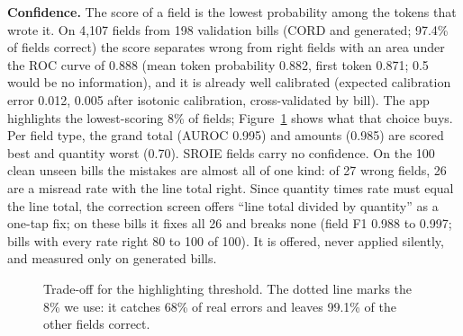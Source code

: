 \documentclass[10pt,a4paper]{article}
\begin{document}
\textbf{Confidence.} The score of a field is the lowest probability among the tokens that wrote it. On 4,107 fields from 198 validation bills (CORD and generated; 97.4\% of fields correct) the score separates wrong from right fields with an area under the ROC curve of 0.888 (mean token probability 0.882, first token 0.871; 0.5 would be no information), and it is already well calibrated (expected calibration error 0.012, 0.005 after isotonic calibration, cross-validated by bill). The app highlights the lowest-scoring 8\% of fields; Figure~\ref{fig:conf} shows what that choice buys. Per field type, the grand total (AUROC 0.995) and amounts (0.985) are scored best and quantity worst (0.70). SROIE fields carry no confidence. On the 100 clean unseen bills the mistakes are almost all of one kind: of 27 wrong fields, 26 are a misread rate with the line total right. Since quantity times rate must equal the line total, the correction screen offers ``line total divided by quantity'' as a one-tap fix; on these bills it fixes all 26 and breaks none (field F1 0.988 to 0.997; bills with every rate right 80 to 100 of 100). It is offered, never applied silently, and measured only on generated bills.

\begin{figure}[!ht]
\centering
{}
\caption{Trade-off for the highlighting threshold. The dotted line marks the 8\% we use: it catches 68\% of real errors and leaves 99.1\% of the other fields correct.}\label{fig:conf}
\end{figure}
\end{document}
